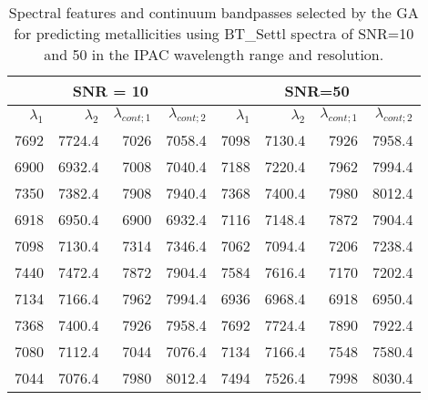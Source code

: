 \begin{appendix}
\begin{table*}
\begin{center}
\begin{tabular}{rrrr | rrrr}
  \hline
 \multicolumn{4}{c}{SNR = 10} &  \multicolumn{4}{c}{SNR=50} \\
  \hline
$\lambda_1$ & $\lambda_2$ & $\lambda_{cont;1}$ & $\lambda_{cont;2} $ & $\lambda_1$ & $\lambda_2$ & $\lambda_{cont;1}$ & $\lambda_{cont;2} $ \\ 
  \hline
7692 & 7724.4 &	7026 & 7058.4  &  7098 & 7130.4 & 7926 & 7958.4 \\
6900 & 6932.4 &	7008 & 7040.4  &  7188 & 7220.4 & 7962 & 7994.4  \\
7350 & 7382.4 &	7908 & 7940.4  &  7368 & 7400.4 & 7980 & 8012.4  \\
6918 & 6950.4 &	6900 & 6932.4  &  7116 & 7148.4 & 7872 & 7904.4  \\
7098 & 7130.4 &	7314 & 7346.4  &  7062 & 7094.4 & 7206 & 7238.4  \\
7440 & 7472.4 &	7872 & 7904.4  &  7584 & 7616.4 & 7170 & 7202.4  \\
7134 & 7166.4 &	7962 & 7994.4  &  6936 & 6968.4 & 6918 & 6950.4  \\
7368 & 7400.4 &	7926 & 7958.4  &  7692 & 7724.4 & 7890 & 7922.4  \\
7080 & 7112.4 &	7044 & 7076.4  &  7134 & 7166.4 & 7548 & 7580.4  \\
7044 & 7076.4 &	7980 & 8012.4  &  7494 & 7526.4 & 7998 & 8030.4  \\
\hline
\end{tabular}
\caption {Spectral features and continuum bandpasses selected by the
  GA for predicting metallicities using BT\_Settl spectra of SNR=10
  and 50 in the IPAC wavelength range and
  resolution.} \label{tab:ipac-met-noisy}
\end{center}
\end{table*}

\end{appendix}

